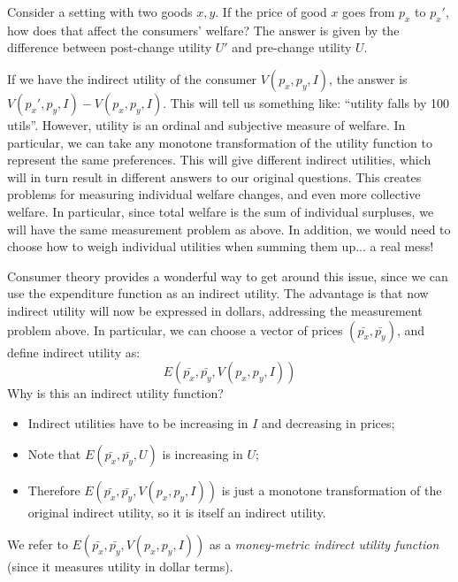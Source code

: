 \documentclass[11pt,english]{article}
\begin{document}
Consider a setting with two goods $x,y$. If the price of good $x$
goes from $p_{x}$ to $p_{x}'$, how does that affect the consumers'
welfare? The answer is given by the difference between post-change
utility $U'$ and pre-change utility $U$.

If we have the indirect utility of the consumer $V(p_{x},p_{y},I)$,
the answer is $V(p_{x}',p_{y},I)-V(p_{x},p_{y},I)$. This will tell
us something like: ``utility falls by 100 utils''. However, utility
is an ordinal and subjective measure of welfare. In particular, we
can take any monotone transformation of the utility function to represent
the same preferences. This will give different indirect utilities,
which will in turn result in different answers to our original questions.
This creates problems for measuring individual welfare changes, and
even more collective welfare. In particular, since total welfare is
the sum of individual surpluses, we will have the same measurement
problem as above. In addition, we would need to choose how to weigh
individual utilities when summing them up... a real mess! 

Consumer theory provides a wonderful way to get around this issue,
since we can use the expenditure function as an indirect utility.
The advantage is that now indirect utility will now be expressed in
dollars, addressing the measurement problem above. In particular,
we can choose a vector of prices $\left(\bar{p_{x}},\bar{p_{y}}\right)$,
and define indirect utility as:
\[
E\left(\bar{p_{x}},\bar{p_{y}},V(p_{x},p_{y},I)\right)
\]
Why is this an indirect utility function?
\begin{itemize}
\item Indirect utilities have to be increasing in $I$ and decreasing in
prices;
\item Note that $E\left(\bar{p_{x}},\bar{p_{y}},U\right)$ is increasing
in $U$;
\item Therefore $E\left(\bar{p_{x}},\bar{p_{y}},V(p_{x},p_{y},I)\right)$
is just a monotone transformation of the original indirect utility,
so it is itself an indirect utility.
\end{itemize}
We refer to $E\left(\bar{p_{x}},\bar{p_{y}},V(p_{x},p_{y},I)\right)$
as a \emph{money-metric indirect utility function }(since it measures
utility in dollar terms).
\end{document}
